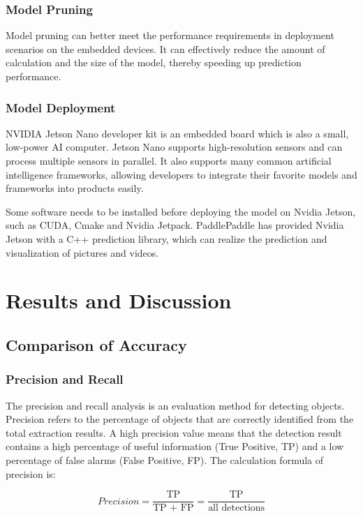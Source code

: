 \documentclass[sensors,article,submit,moreauthors,pdftex]{Definitions/mdpi}
\begin{document}
\begin{paracol}{2}
\subsubsection{Model Pruning}
Model pruning can better meet the performance requirements in deployment scenarios on the embedded devices. It can effectively reduce the amount of calculation and the size of the model, thereby speeding up prediction performance.

\subsubsection{Model Deployment}
NVIDIA Jetson Nano developer kit is an embedded board which is also a small, low-power AI computer. Jetson Nano supports high-resolution sensors and can process multiple sensors in parallel. It also supports many common artificial intelligence frameworks, allowing developers to integrate their favorite models and frameworks into products easily.

Some software needs to be installed before deploying the model on Nvidia Jetson, such as CUDA, Cmake and Nvidia Jetpack. PaddlePaddle has provided Nvidia Jetson with a C++ prediction library, which can realize the prediction and visualization of pictures and videos.


\section{Results and Discussion}

\subsection{Comparison of Accuracy}

\subsubsection{Precision and Recall}

The precision and recall analysis is an evaluation method for detecting objects. Precision refers to the percentage of objects that are correctly identified from the total extraction results. A high precision value means that the detection result contains a high percentage of useful information (True Positive, TP) and a low percentage of false alarms (False Positive, FP). The calculation formula of precision is:


\begin{equation} 
Precision = \frac{\text{TP}}{\text{TP + FP} } = \frac{\text{TP}}{\text{all\ detections} }
\end{equation}


\end{paracol}
\end{document}

